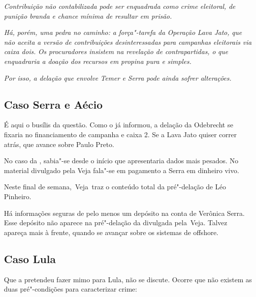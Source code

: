\emph{ }

\emph{Contribuição não contabilizada pode ser enquadrada como crime
eleitoral, de punição branda e chance mínima de resultar em prisão.}

\emph{ }

\emph{Há, porém, uma pedra no caminho: a força"-tarefa da Operação Lava
Jato, que não aceita a versão de contribuições desinteressadas para
campanhas eleitorais via caixa dois. Os procuradores insistem na
revelação de contrapartidas, o que enquadraria a doação dos recursos em
propina pura e simples.}

\emph{ }

\emph{Por isso, a delação que envolve Temer e Serra pode ainda sofrer
alterações.}

\subsection{Caso Serra e Aécio}

É aqui o busílis da questão. Como o  já informou, a delação da
Odebrecht se fixaria no financiamento de campanha e caixa 2. Se a Lava
Jato quiser correr atrás, que avance sobre Paulo Preto.

No caso da , sabia"-se desde o início que apresentaria dados mais
pesados. No material divulgado pela Veja fala"-se em pagamento a Serra em
dinheiro vivo.

Neste final de semana,~Veja~traz o conteúdo total da pré"-delação de Léo
Pinheiro.

Há informações seguras de pelo menos um depósito na conta de Verônica
Serra. Esse depósito não aparece na pré"-delação da  divulgada
pela~Veja. Talvez apareça mais à frente, quando se avançar sobre os
sistemas de offshore.

\subsection{Caso Lula}

Que a  pretendeu fazer mimo para Lula, não se discute. Ocorre que não
existem as duas pré"-condições para caracterizar crime:

